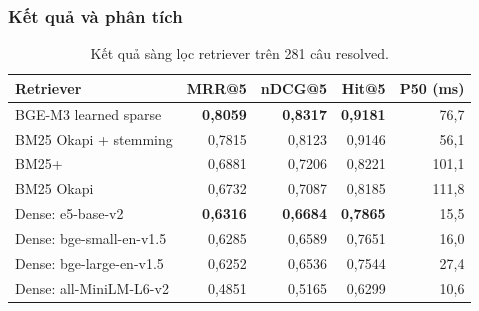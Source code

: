 \subsubsection{Kết quả và phân tích}
\begin{table}[H]
  \centering
  \caption{Kết quả sàng lọc retriever trên 281 câu resolved.}
  \label{tab:phase1-retriever-screening}
  \small
  \begin{tabular}{lrrrr}
    \toprule
    \textbf{Retriever} & \textbf{MRR@5} & \textbf{nDCG@5} &
    \textbf{Hit@5} & \textbf{P50 (ms)} \\
    \midrule
    BGE-M3 learned sparse          & \textbf{0,8059} & \textbf{0,8317} & \textbf{0,9181} & 76,7 \\
    BM25 Okapi + stemming          & 0,7815 & 0,8123 & 0,9146 & 56,1 \\
    BM25+                          & 0,6881 & 0,7206 & 0,8221 & 101,1 \\
    BM25 Okapi                     & 0,6732 & 0,7087 & 0,8185 & 111,8 \\
    Dense: e5-base-v2              & \textbf{0,6316} & \textbf{0,6684} & \textbf{0,7865} & 15,5 \\
    Dense: bge-small-en-v1.5       & 0,6285 & 0,6589 & 0,7651 & 16,0 \\
    Dense: bge-large-en-v1.5       & 0,6252 & 0,6536 & 0,7544 & 27,4 \\
    Dense: all-MiniLM-L6-v2        & 0,4851 & 0,5165 & 0,6299 & 10,6 \\
    \bottomrule
  \end{tabular}
\end{table}

